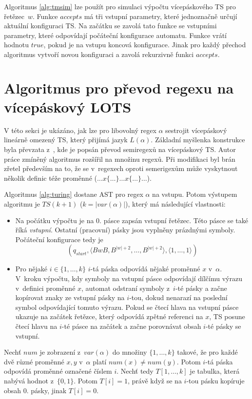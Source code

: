 \documentclass[thesis=B,czech]{FITthesis}[2019/12/23]
\theoremstyle{definition}
\begin{document}
Algoritmus \ref{alg:tmsim} lze použít pro simulaci výpočtu vícepáskového TS pro řetězec~$w$. Funkce $accepts$ má tři vstupní parametry, které jednoznačně určují aktuální konfiguraci TS. Na začátku se zavolá tato funkce se vstupními parametry, které odpovídají počáteční konfigurace automatu. Funkce vrátí hodnotu $true$, pokud je na vstupu koncová konfigurace. Jinak pro každý přechod algoritmus vytvoří novou konfiguraci a zavolá rekurzivně funkci $accepts$. 

\section{Algoritmus pro převod regexu na vícepáskový LOTS}\label{sec:turing}
V této sekci je ukázáno, jak lze pro libovolný regex $\alpha$ sestrojit vícepáskový lineárně omezený TS, který přijímá jazyk $L\left(\alpha\right)$.
Základní myšlenka konstrukce byla převzata z~\cite[s. 8]{campeanu}, kde je popsán převod semiregexů na vícepáskový TS. Autor práce zmíněný algoritmus rozšířil na množinu regexů. Při modifikaci byl brán zřetel především na to, že se v~regexech oproti semerigexům může vyskytnout několik definic téže proměnné ($\dots x\{\dots\}\dots x\{\dots\}\dots$).

Algoritmus \ref{alg:turing} dostane AST pro regex $\alpha$ na vstupu. 
Potom výstupem algoritmu je $TS(k+1)$ ($k=|var(\alpha)|$), který má následující vlastnosti:
\begin{itemize}
	\item{Na počátku výpočtu je na 0. pásce zapsán vstupní řetězec. Této pásce se také říká \emph{vstupní}. Ostatní (pracovní) pásky jsou vyplněny prázdnými symboly. Počáteční konfigurace tedy je $$\left(q_{start}, \langle BwB, B^{|w|+2}, \dots, B^{|w|+2} \rangle,  \langle 1, \dots, 1\rangle\right)$$}
	\item{Pro nějaké $i \in \{1, \dots, k\}$ $i$-tá páska odpovídá nějaké proměnné $x$ v~$\alpha$. V~kroku výpočtu, kdy symboly na vstupní pásce odpovídají dílčímu výrazu v~definici proměnné $x$, automat odstraní symboly z~$i$-té pásky a začne kopírovat znaky ze vstupní pásky na $i$-tou, dokud nenarazí na poslední symbol odpovídající tomuto výrazu. Pokud se čtecí hlava na vstupní pásce ukazuje na začátek řetězce, který odpovídá zpětné referenci na $x$, TS posune čtecí hlavu na $i$-té pásce na začátek a začne porovnávat obsah $i$-té pásky se vstupní.}
\end{itemize} 

Nechť $num$ je zobrazení z~$var(\alpha)$ do množiny $\{1, \dots, k\}$ takové, že pro každé dvě různé proměnné $x, y$ v~$\alpha$ platí $num(x) \ne num(y)$. Potom $i$-tá páska odpovídá proměnné označené číslem $i$. Nechť tedy $T[1, \dots, k]$ je tabulka, která nabývá hodnot z~$\{0,1\}$. Potom $T[i] = 1$, právě když se na $i$-tou pásku kopíruje obsah 0. pásky, jinak $T[i] = 0$. 
\end{document}
